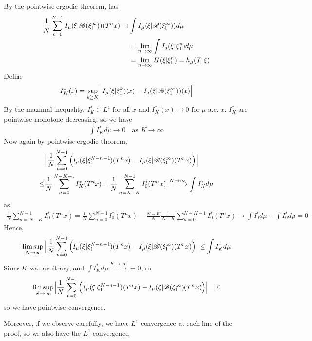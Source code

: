 \documentclass[12pt,a4paper]{report}
\newenvironment{proof}
{\begin{changemargin}{1cm}{0.5cm} 
	}%
	{\end{changemargin}
}
\begin{document}
\begin{proof}
\quad By the pointwise ergodic theorem, has
\begin{align*}
\frac{1}{N} \sum_{n=0}^{N-1} I_{\mu}( \xi | \mathscr{B}(\xi_1^{\infty}) ) (T^n x) \rightarrow & \int I_{\mu}(\xi | \mathscr{B}(\xi_1^{\infty})) d\mu \\
& = \lim_{n\rightarrow \infty} \int I_{\mu}(\xi | \xi_1^n) d\mu \\
& = \lim_{n\rightarrow \infty} H(\xi | \xi_1^n) = h_{\mu}(T, \xi)
\end{align*}
Define
\begin{align*}
I_K^* (x) = \sup_{k\geq K} \Big| I_{\mu}(\xi | \xi_1^k)(x) - I_{\mu}(\xi | \mathscr{B}(\xi_1^{\infty}))(x) \Big|
\end{align*}
By the maximal inequality, $I_K^* \in L^1$ for all $x$ and $I_K^*(x) \rightarrow 0$ for $\mu$-a.e. $x$. $I_K^*$ are pointwise monotone decreasing, so we have
\begin{align*}
\int I_K^* d\mu \rightarrow 0 \quad \text{as } K \rightarrow \infty
\end{align*}
Now again by pointwise ergodic theorem,
\begin{align*}
& \Big| \frac{1}{N} \sum_{n=0}^{N-1} \Big( I_{\mu}(\xi | \xi_1^{N-n-1})(T^n x) - I_{\mu}(\xi | \mathscr{B}(\xi_1^{\infty})(T^n x) \Big) \Big| \\
\leq & \frac{1}{N} \sum_{n=0}^{N-K-1} I_K^* (T^n x) + \frac{1}{N} \sum_{n=N-K}^{N-1} I_0^* (T^n x) \xrightarrow{N\rightarrow \infty} \int I_K^* d\mu
\end{align*}
as 
\begin{align*}
\frac{1}{N} \sum_{n=N-K}^{N-1} I_0^* (T^n x) = \frac{1}{N} \sum_{n=0}^{N-1}I_0^* (T^n x) - \frac{N-K}{N} \frac{1}{N-K} \sum_{n=0}^{N-K-1} I_0^*(T^n x) \rightarrow \int I_0^* d\mu -\int I_0^* d\mu =0
\end{align*}
Hence,
\begin{align*}
\limsup_{N\rightarrow \infty} \Big| \frac{1}{N} \sum_{n=0}^{N-1} \Big( I_{\mu}(\xi | \xi_1^{N-n-1})(T^n x) - I_{\mu}(\xi | \mathscr{B}(\xi_1^{\infty})(T^n x) \Big) \Big| \leq \int I_K^* d\mu
\end{align*}
Since $K$ was arbitrary, and $\int I_K^* d\mu \xrightarrow{K\rightarrow \infty} =0$, so 
\begin{align*}
\limsup_{N\rightarrow \infty} \Big| \frac{1}{N} \sum_{n=0}^{N-1} \Big( I_{\mu}(\xi | \xi_1^{N-n-1})(T^n x) - I_{\mu}(\xi | \mathscr{B}(\xi_1^{\infty})(T^n x) \Big) \Big| =0
\end{align*}
so we have pointwise convergence.

\quad Moreover, if we observe carefully, we have $L^1$ convergence at each line of the proof, so we also have the $L^1$ convergence.

\eop
\end{proof}
\s
\end{document}
